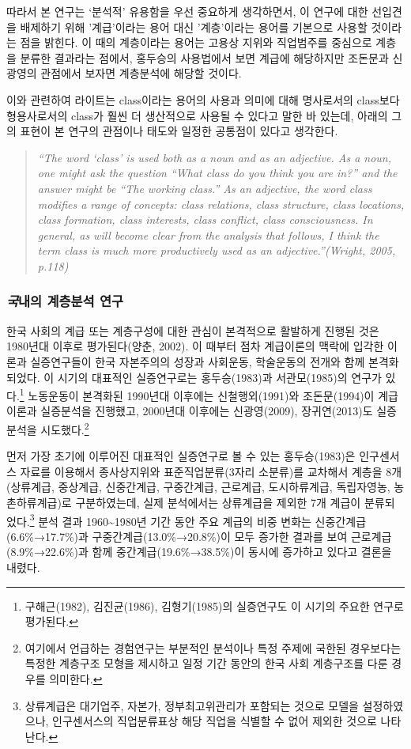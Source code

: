 \documentclass[
  letterpaper,
  DIV=11,
  numbers=noendperiod]{scrartcl}
\begin{document}
따라서 본 연구는 `분석적' 유용함을 우선 중요하게 생각하면서, 이 연구에
대한 선입견을 배제하기 위해 '계급'이라는 용어 대신 '계층'이라는 용어를
기본으로 사용할 것이라는 점을 밝힌다. 이 때의 계층이라는 용어는 고용상
지위와 직업범주를 중심으로 계층을 분류한 결과라는 점에서, 홍두승의
사용법에서 보면 계급에 해당하지만 조돈문과 신광영의 관점에서 보자면
계층분석에 해당할 것이다.

이와 관련하여 라이트는 class이라는 용어의 사용과 의미에 대해 명사로서의
class보다 형용사로서의 class가 훨씬 더 생산적으로 사용될 수 있다고 말한
바 있는데, 아래의 그의 표현이 본 연구의 관점이나 태도와 일정한 공통점이
있다고 생각한다.

\begin{quote}
\emph{``The word `class' is used both as a noun and as an adjective. As
a noun, one might ask the question ``What class do you think you are
in?'' and the answer might be ``The working class.'' As an adjective,
the word class modifies a range of concepts: class relations, class
structure, class locations, class formation, class interests, class
conflict, class consciousness. In general, as will become clear from the
analysis that follows, I think the term class is much more productively
used as an adjective.''(Wright, 2005, p.118)}
\end{quote}

\subsubsection{\texorpdfstring{\emph{국}내의 계층분석
연구}{국내의 계층분석 연구}}\label{uxad6duxb0b4uxc758-uxacc4uxce35uxbd84uxc11d-uxc5f0uxad6c}

한국 사회의 계급 또는 계층구성에 대한 관심이 본격적으로 활발하게 진행된
것은 1980년대 이후로 평가된다(양춘, 2002). 이 때부터 점차 계급이론의
맥락에 입각한 이론과 실증연구들이 한국 자본주의의 성장과 사회운동,
학술운동의 전개와 함께 본격화되었다. 이 시기의 대표적인 실증연구로는
홍두승(1983)과 서관모(1985)의 연구가 있다.\footnote{구해근(1982),
  김진균(1986), 김형기(1985)의 실증연구도 이 시기의 주요한 연구로
  평가된다.} 노동운동이 본격화된 1990년대 이후에는 신철행외(1991)와
조돈문(1994)이 계급이론과 실증분석을 진행했고, 2000년대 이후에는
신광영(2009), 장귀연(2013)도 실증분석을 시도했다.\footnote{여기에서
  언급하는 경험연구는 부분적인 분석이나 특정 주제에 국한된 경우보다는
  특정한 계층구조 모형을 제시하고 일정 기간 동안의 한국 사회 계층구조를
  다룬 경우를 의미한다.}

먼저 가장 초기에 이루어진 대표적인 실증연구로 볼 수 있는 홍두승(1983)은
인구센서스 자료를 이용해서 종사상지위와 표준직업분류(3자리 소분류)를
교차해서 계층을 8개(상류계급, 중상계급, 신중간계급, 구중간계급,
근로계급, 도시하류계급, 독립자영농, 농촌하류계급)로 구분하였는데, 실제
분석에서는 상류계급을 제외한 7개 계급이 분류되었다.\footnote{상류계급은
  대기업주, 자본가, 정부최고위관리가 포함되는 것으로 모델을
  설정하였으나, 인구센서스의 직업분류표상 해당 직업을 식별할 수 없어
  제외한 것으로 나타난다.} 분석 결과 1960\textasciitilde1980년 기간 동안
주요 계급의 비중 변화는 신중간계급(6.6\%→17.7\%)과
구중간계급(13.0\%→20.8\%)이 모두 증가한 결과를 보여
근로계급(8.9\%→22.6\%)과 함께 중간계급(19.6\%→38.5\%)이 동시에 증가하고
있다고 결론을 내렸다.
\end{document}
